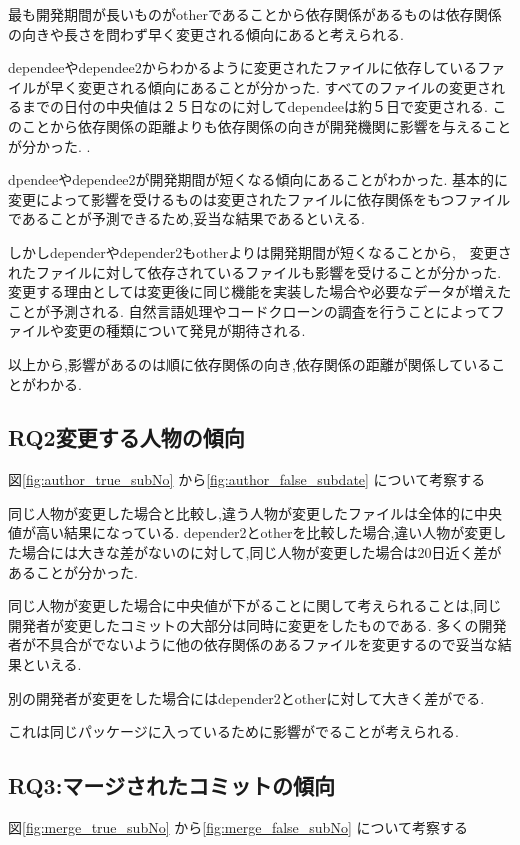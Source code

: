 \documentclass[submit,ses,noauthor]{ipsj} %
\begin{document}
最も開発期間が長いものがotherであることから依存関係があるものは依存関係の向きや長さを問わず早く変更される傾向にあると考えられる.


dependeeやdependee2からわかるように変更されたファイルに依存しているファイルが早く変更される傾向にあることが分かった.
すべてのファイルの変更されるまでの日付の中央値は２５日なのに対してdependeeは約５日で変更される.
このことから依存関係の距離よりも依存関係の向きが開発機関に影響を与えることが分かった.
.

dpendeeやdependee2が開発期間が短くなる傾向にあることがわかった.
基本的に変更によって影響を受けるものは変更されたファイルに依存関係をもつファイルであることが予測できるため,妥当な結果であるといえる.

しかしdependerやdepender2もotherよりは開発期間が短くなることから,　変更されたファイルに対して依存されているファイルも影響を受けることが分かった.
変更する理由としては変更後に同じ機能を実装した場合や必要なデータが増えたことが予測される.
自然言語処理やコードクローンの調査を行うことによってファイルや変更の種類について発見が期待される.


以上から,影響があるのは順に依存関係の向き,依存関係の距離が関係していることがわかる.



\subsection{RQ2変更する人物の傾向}
図\ref{fig:author_true_subNo} から\ref{fig:author_false_subdate} について考察する

同じ人物が変更した場合と比較し,違う人物が変更したファイルは全体的に中央値が高い結果になっている.
depender2とotherを比較した場合,違い人物が変更した場合には大きな差がないのに対して,同じ人物が変更した場合は20日近く差があることが分かった.

同じ人物が変更した場合に中央値が下がることに関して考えられることは,同じ開発者が変更したコミットの大部分は同時に変更をしたものである.
多くの開発者が不具合がでないように他の依存関係のあるファイルを変更するので妥当な結果といえる.

別の開発者が変更をした場合にはdepender2とotherに対して大きく差がでる.

これは同じパッケージに入っているために影響がでることが考えられる.


\subsection{RQ3:マージされたコミットの傾向}
図\ref{fig:merge_true_subNo} から\ref{fig:merge_false_subNo} について考察する
\end{document}
